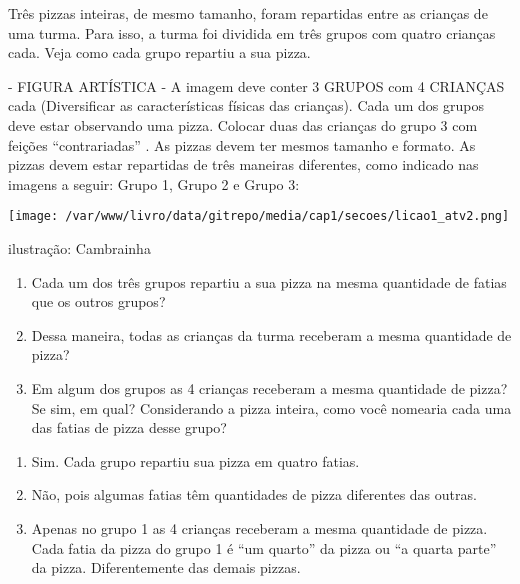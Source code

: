 \documentclass[a4paper,12pt,twoside]{book}
\begin{document}
Três pizzas inteiras, de mesmo tamanho, foram repartidas entre as crianças de uma turma. Para isso, a turma foi dividida em três grupos com quatro crianças cada. Veja como cada grupo repartiu a sua pizza.

\begin{imagem*}[breakable]{}{}    - FIGURA ARTÍSTICA - A imagem deve conter 3 GRUPOS com 4 CRIANÇAS cada (Diversificar as características físicas das crianças). Cada um dos grupos deve estar observando uma pizza. Colocar duas das crianças do grupo 3 com feições   ``contrariadas''  . As pizzas devem ter mesmos tamanho e formato. As pizzas devem estar repartidas de três maneiras diferentes, como indicado nas imagens a seguir: Grupo 1, Grupo 2 e Grupo 3:   
  
    \texttt{[image: /var/www/livro/data/gitrepo/media/cap1/secoes/licao1\_atv2.png]}  
  
  ilustração: Cambrainha  
  
\end{imagem*}

\begin{enumerate} [\quad a)] %
  \item     Cada um dos três grupos repartiu a sua pizza na mesma quantidade de fatias que os outros grupos?
  \item     Dessa maneira, todas as crianças da turma receberam a mesma quantidade de pizza?
  \item     Em algum dos grupos as 4 crianças receberam a mesma quantidade de pizza? Se sim, em qual? Considerando a pizza inteira, como você nomearia cada uma das fatias de pizza desse grupo? 
\end{enumerate} %



\begin{resposta*}[breakable]{}{}  
\begin{enumerate} [\quad a)] %
    \item       Sim. Cada grupo repartiu sua pizza em quatro fatias.
    \item       Não, pois algumas fatias têm quantidades de pizza diferentes das outras.
    \item       Apenas no grupo 1 as 4 crianças receberam a mesma quantidade de pizza. Cada fatia da pizza do grupo 1 é       ``um quarto''       da pizza ou       ``a quarta parte''       da pizza. Diferentemente das demais pizzas.
\end{enumerate} %
  
\end{resposta*}
\end{document}
